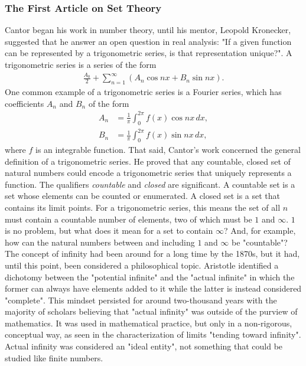 \subsubsection{The First Article on Set Theory}

Cantor began his work in number theory, until his mentor, Leopold Kronecker, suggested that he answer an open question in real analysis: "If a given function can be represented by a trigonometric series, is that representation unique?". A trigonometric series is a series of the form
\begin{align*}
\frac{A_0}{2}+\sum_{n=1}^{\infty}(A_n\cos nx + B_n\sin nx).
\end{align*}
One common example of a trigonometric series is a Fourier series, which has coefficients $A_n$ and $B_n$ of the form
\begin{align*}
A_n&=\frac{1}{\pi}\int_{0}^{2\pi}f(x)\cos nx\,dx, \\[1mm]
B_n&=\frac{1}{\pi}\int_{0}^{2\pi}f(x)\sin nx\,dx,
\end{align*}
where $f$ is an integrable function. That said, Cantor's work concerned the general definition of a trigonometric series. He proved that any countable, closed set of natural numbers could encode a trigonometric series that uniquely represents a function. The qualifiers \textit{countable} and \textit{closed} are significant. A countable set is a set whose elements can be counted or enumerated. A closed set is a set that contains its limit points. For a trigonometric series, this means the set of all $n$ must contain a countable number of elements, two of which must be $1$ and $\infty$. $1$ is no problem, but what does it mean for a set to contain $\infty$? And, for example, how can the natural numbers between and including $1$ and $\infty$ be "countable"? \\

The concept of infinity had been around for a long time by the 1870s, but it had, until this point, been considered a philosophical topic. Aristotle identified a dichotomy between the "potential infinite" and the "actual infinite" in which the former can always have elements added to it while the latter is instead considered "complete". This mindset persisted for around two-thousand years with the majority of scholars believing that "actual infinity" was outside of the purview of mathematics. It was used in mathematical practice, but only in a non-rigorous, conceptual way, as seen in the characterization of limits "tending toward infinity". Actual infinity was considered an "ideal entity", not something that could be studied like finite numbers. \\

